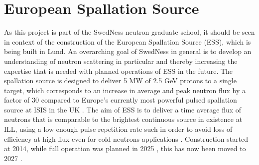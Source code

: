 \section{European Spallation Source}
As this project is part of the SwedNess neutron graduate school, it should be seen in context of the construction of the European Spallation Source (ESS), which is being built in Lund. An overarching goal of SwedNess in general is to develop an understanding of neutron scattering in particular and thereby increasing the expertise that is needed with planned operations of ESS in the future. The spallation source is designed to deliver 5 MW of 2.5 GeV protons to a single target, which corresponds to an increase in average and peak neutron flux by a factor of 30 compared to Europe's currently most powerful pulsed spallation source at ISIS in the UK \cite{ESSstudy}. The aim of ESS is to deliver a time average flux of neutrons that is comparable to the brightest continuous source in existence at ILL, using a low enough pulse repetition rate such in order to avoid loss of efficiency at high flux even for cold neutrons applications \cite{ESSdesign}. Construction started at 2014, while full operation was planned in 2025 \cite{ESSdesign}, this has now been moved to 2027 \cite{ESS_operational}. 

